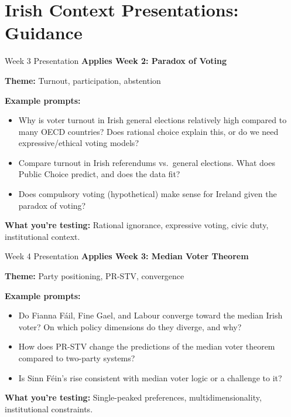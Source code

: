 \documentclass[10pt]{beamer}
\begin{document}
\section{Irish Context Presentations: Guidance}

\begin{frame}{Week 3 Presentation}
\textbf{Applies Week 2: Paradox of Voting}

\textbf{Theme:} Turnout, participation, abstention

\textbf{Example prompts:}
\begin{itemize}
\item Why is voter turnout in Irish general elections relatively high compared to many OECD countries? Does rational choice explain this, or do we need expressive/ethical voting models?
\item Compare turnout in Irish referendums vs.\ general elections. What does Public Choice predict, and does the data fit?
\item Does compulsory voting (hypothetical) make sense for Ireland given the paradox of voting?
\end{itemize}

\textbf{What you're testing:} Rational ignorance, expressive voting, civic duty, institutional context.
\end{frame}

\begin{frame}{Week 4 Presentation}
\textbf{Applies Week 3: Median Voter Theorem}

\textbf{Theme:} Party positioning, PR-STV, convergence

\textbf{Example prompts:}
\begin{itemize}
\item Do Fianna Fáil, Fine Gael, and Labour converge toward the median Irish voter? On which policy dimensions do they diverge, and why?
\item How does PR-STV change the predictions of the median voter theorem compared to two-party systems?
\item Is Sinn Féin's rise consistent with median voter logic or a challenge to it?
\end{itemize}

\textbf{What you're testing:} Single-peaked preferences, multidimensionality, institutional constraints.
\end{frame}
\end{document}
